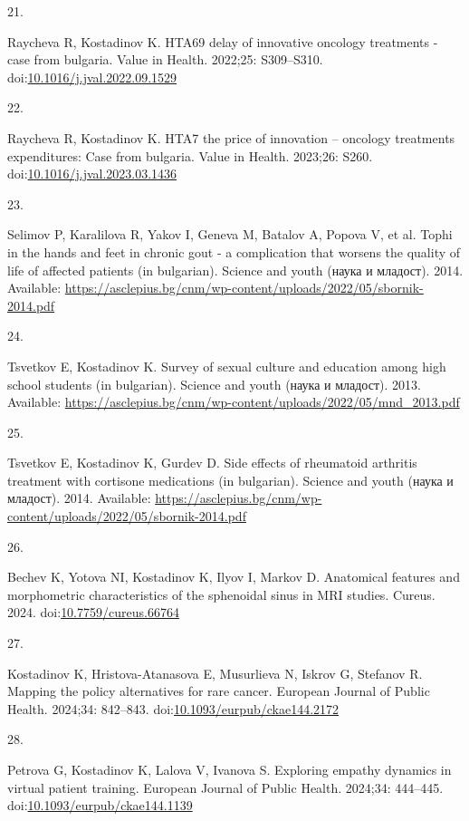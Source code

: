 \documentclass[
  12pt,
  letterpaper,
  DIV=11,
  numbers=noendperiod]{scrartcl}
\newlength{\cslhangindent}
\newlength{\csllabelwidth}
\newenvironment{CSLReferences}[2] %
 {\begin{list}{}{%
  \setlength{\itemindent}{0pt}
  \setlength{\leftmargin}{0pt}
  \setlength{\parsep}{0pt}
  \ifodd #1
   \setlength{\leftmargin}{\cslhangindent}
   \setlength{\itemindent}{-1\cslhangindent}
  \fi
  \setlength{\itemsep}{#2\baselineskip}}}
 {\end{list}}
\newcommand{\CSLLeftMargin}[1]{\parbox[t]{\csllabelwidth}{\strut#1\strut}}
\newcommand{\CSLRightInline}[1]{\parbox[t]{\linewidth - \csllabelwidth}{\strut#1\strut}}
\begin{document}
\begin{CSLReferences}{0}{1}
\CSLLeftMargin{21. }%
\CSLRightInline{Raycheva R, Kostadinov K. HTA69 delay of innovative
oncology treatments - case from bulgaria. Value in Health. 2022;25:
S309--S310.
doi:\href{https://doi.org/10.1016/j.jval.2022.09.1529}{10.1016/j.jval.2022.09.1529}}

\CSLLeftMargin{22. }%
\CSLRightInline{Raycheva R, Kostadinov K. HTA7 the price of innovation
-- oncology treatments expenditures: Case from bulgaria. Value in
Health. 2023;26: S260.
doi:\href{https://doi.org/10.1016/j.jval.2023.03.1436}{10.1016/j.jval.2023.03.1436}}

\CSLLeftMargin{23. }%
\CSLRightInline{Selimov P, Karalilova R, Yakov I, Geneva M, Batalov A,
Popova V, et al. Tophi in the hands and feet in chronic gout - a
complication that worsens the quality of life of affected patients (in
bulgarian). Science and youth (наука и младост). 2014. Available:
\url{https://asclepius.bg/cnm/wp-content/uploads/2022/05/sbornik-2014.pdf}}

\CSLLeftMargin{24. }%
\CSLRightInline{Tsvetkov E, Kostadinov K. Survey of sexual culture and
education among high school students (in bulgarian). Science and youth
(наука и младост). 2013. Available:
\url{https://asclepius.bg/cnm/wp-content/uploads/2022/05/mnd_2013.pdf}}

\CSLLeftMargin{25. }%
\CSLRightInline{Tsvetkov E, Kostadinov K, Gurdev D. Side effects of
rheumatoid arthritis treatment with cortisone medications (in
bulgarian). Science and youth (наука и младост). 2014. Available:
\url{https://asclepius.bg/cnm/wp-content/uploads/2022/05/sbornik-2014.pdf}}

\CSLLeftMargin{26. }%
\CSLRightInline{Bechev K, Yotova NI, Kostadinov K, Ilyov I, Markov D.
Anatomical features and morphometric characteristics of the sphenoidal
sinus in MRI studies. Cureus. 2024.
doi:\href{https://doi.org/10.7759/cureus.66764}{10.7759/cureus.66764}}

\CSLLeftMargin{27. }%
\CSLRightInline{Kostadinov K, Hristova-Atanasova E, Musurlieva N, Iskrov
G, Stefanov R. Mapping the policy alternatives for rare cancer. European
Journal of Public Health. 2024;34: 842--843.
doi:\href{https://doi.org/10.1093/eurpub/ckae144.2172}{10.1093/eurpub/ckae144.2172}}

\CSLLeftMargin{28. }%
\CSLRightInline{Petrova G, Kostadinov K, Lalova V, Ivanova S. Exploring
empathy dynamics in virtual patient training. European Journal of Public
Health. 2024;34: 444--445.
doi:\href{https://doi.org/10.1093/eurpub/ckae144.1139}{10.1093/eurpub/ckae144.1139}}

\end{CSLReferences}
\end{document}
